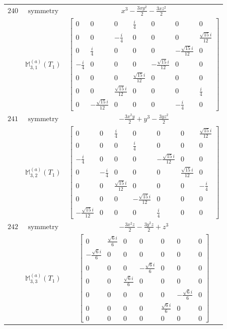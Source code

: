 \documentclass[fleqn,8pt,landscape]{jsarticle}
\begin{document}
\begin{longtable}{ccc}
$ 240 $ & $ \text{symmetry} $ & $ x^{3} - \frac{3 x y^{2}}{2} - \frac{3 x z^{2}}{2} $ \\
$  $ & $ \mathbb{M}_{3,1}^{(a)}(T_{1}) $ & $ \begin{bmatrix} 0 & 0 & 0 & \frac{i}{4} & 0 & 0 & 0 \\ 0 & 0 & - \frac{i}{4} & 0 & 0 & 0 & \frac{\sqrt{15} i}{12} \\ 0 & \frac{i}{4} & 0 & 0 & 0 & - \frac{\sqrt{15} i}{12} & 0 \\ - \frac{i}{4} & 0 & 0 & 0 & - \frac{\sqrt{15} i}{12} & 0 & 0 \\ 0 & 0 & 0 & \frac{\sqrt{15} i}{12} & 0 & 0 & 0 \\ 0 & 0 & \frac{\sqrt{15} i}{12} & 0 & 0 & 0 & \frac{i}{4} \\ 0 & - \frac{\sqrt{15} i}{12} & 0 & 0 & 0 & - \frac{i}{4} & 0 \end{bmatrix} $ \\ \hline
$ 241 $ & $ \text{symmetry} $ & $ - \frac{3 x^{2} y}{2} + y^{3} - \frac{3 y z^{2}}{2} $ \\
$  $ & $ \mathbb{M}_{3,2}^{(a)}(T_{1}) $ & $ \begin{bmatrix} 0 & 0 & \frac{i}{4} & 0 & 0 & 0 & \frac{\sqrt{15} i}{12} \\ 0 & 0 & 0 & \frac{i}{4} & 0 & 0 & 0 \\ - \frac{i}{4} & 0 & 0 & 0 & - \frac{\sqrt{15} i}{12} & 0 & 0 \\ 0 & - \frac{i}{4} & 0 & 0 & 0 & \frac{\sqrt{15} i}{12} & 0 \\ 0 & 0 & \frac{\sqrt{15} i}{12} & 0 & 0 & 0 & - \frac{i}{4} \\ 0 & 0 & 0 & - \frac{\sqrt{15} i}{12} & 0 & 0 & 0 \\ - \frac{\sqrt{15} i}{12} & 0 & 0 & 0 & \frac{i}{4} & 0 & 0 \end{bmatrix} $ \\ \hline
$ 242 $ & $ \text{symmetry} $ & $ - \frac{3 x^{2} z}{2} - \frac{3 y^{2} z}{2} + z^{3} $ \\
$  $ & $ \mathbb{M}_{3,3}^{(a)}(T_{1}) $ & $ \begin{bmatrix} 0 & \frac{\sqrt{6} i}{6} & 0 & 0 & 0 & 0 & 0 \\ - \frac{\sqrt{6} i}{6} & 0 & 0 & 0 & 0 & 0 & 0 \\ 0 & 0 & 0 & - \frac{\sqrt{6} i}{6} & 0 & 0 & 0 \\ 0 & 0 & \frac{\sqrt{6} i}{6} & 0 & 0 & 0 & 0 \\ 0 & 0 & 0 & 0 & 0 & - \frac{\sqrt{6} i}{6} & 0 \\ 0 & 0 & 0 & 0 & \frac{\sqrt{6} i}{6} & 0 & 0 \\ 0 & 0 & 0 & 0 & 0 & 0 & 0 \end{bmatrix} $ \\ \hline

\end{longtable}
\end{document}
